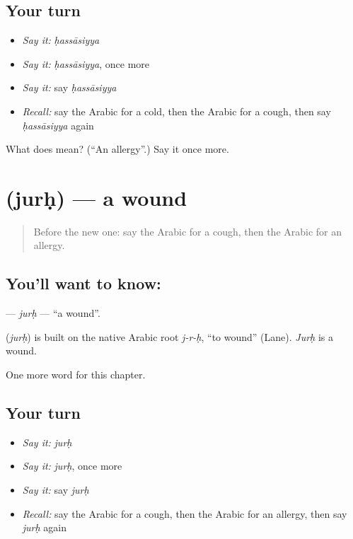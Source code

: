 \subsection*{Your turn}
\begin{itemize}
\raggedright
  \item \emph{Say it:} \emph{ḥassāsiyya}
  \item \emph{Say it:} \emph{ḥassāsiyya}, once more
  \item \emph{Say it:} say \emph{ḥassāsiyya}
  \item \emph{Recall:} say the Arabic for a cold, then the Arabic for a cough, then say \emph{ḥassāsiyya} again
\end{itemize}

\begin{tcolorbox}[breakable,colback=teal!4,colframe=teal!35!black,title={Before you move on}]
What does  mean? (\textquotedblleft{}An allergy\textquotedblright{}.) Say it once more.
\end{tcolorbox}
\section[\texorpdfstring{\ar{جرح} (jurḥ)}{جرح (jurḥ)}]{ (jurḥ) — a wound}

\label{lesson:AR-C200-jurh}



\begin{quote}
Before the new one: say the Arabic for a cough, then the Arabic for an allergy.
\end{quote}

\subsection*{You'll want to know: }
\textbf{} — \emph{jurḥ} — \textquotedblleft{}a wound\textquotedblright{}.

\begin{cousinweb}
\textbf{} (\emph{jurḥ}) is built on the native Arabic root \emph{j-r-ḥ}, \textquotedblleft{}to wound\textquotedblright{} (Lane). \emph{Jurḥ} is a wound.
\end{cousinweb}

\begin{grammarlens}[title={What you've built}]
One more word for this chapter.
\end{grammarlens}

\subsection*{Your turn}
\begin{itemize}
\raggedright
  \item \emph{Say it:} \emph{jurḥ}
  \item \emph{Say it:} \emph{jurḥ}, once more
  \item \emph{Say it:} say \emph{jurḥ}
  \item \emph{Recall:} say the Arabic for a cough, then the Arabic for an allergy, then say \emph{jurḥ} again
\end{itemize}


